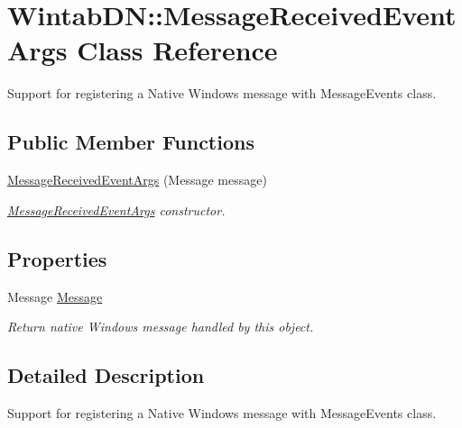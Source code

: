 \hypertarget{class_wintab_d_n_1_1_message_received_event_args}{
\section{WintabDN::MessageReceivedEventArgs Class Reference}
\label{class_wintab_d_n_1_1_message_received_event_args}
}


Support for registering a Native Windows message with MessageEvents class.  


\subsection*{Public Member Functions}
\begin{DoxyCompactItemize}
\item 
\hyperlink{class_wintab_d_n_1_1_message_received_event_args_a6ed1e31bfff899ab3fbe4d843f6ac8c3}{MessageReceivedEventArgs} (Message message)
\begin{DoxyCompactList}\small\item\em \hyperlink{class_wintab_d_n_1_1_message_received_event_args}{MessageReceivedEventArgs} constructor. \item\end{DoxyCompactList}\end{DoxyCompactItemize}
\subsection*{Properties}
\begin{DoxyCompactItemize}
\item 
Message \hyperlink{class_wintab_d_n_1_1_message_received_event_args_a5096f55c5575763d1738d07321ef0b67}{Message}
\begin{DoxyCompactList}\small\item\em Return native Windows message handled by this object. \item\end{DoxyCompactList}\end{DoxyCompactItemize}


\subsection{Detailed Description}
Support for registering a Native Windows message with MessageEvents class. 

